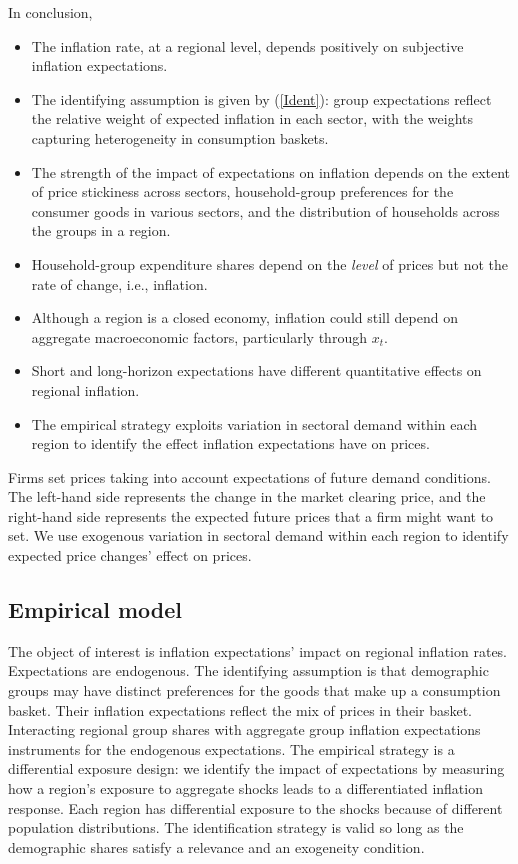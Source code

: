\documentclass[12pt]{article}
\begin{document}
In conclusion,
\begin{itemize}
\item The inflation rate, at a regional level, depends positively on subjective inflation expectations.
\item The identifying assumption is given by (\ref{Ident}): group expectations reflect the relative weight of expected inflation in each sector, with the weights capturing heterogeneity in consumption baskets.
\item The strength of the impact of expectations on inflation depends on the extent of price stickiness across sectors, household-group preferences for the consumer goods in various sectors, and the distribution of households across the groups in a region.
\item Household-group expenditure shares depend on the \emph{level} of prices but not the rate of change, i.e., inflation.
\item Although a region is a closed economy, inflation could still depend on aggregate macroeconomic factors, particularly through $x_t$. 
\item Short and long-horizon expectations have different quantitative effects on regional inflation.
\item The empirical strategy exploits variation in sectoral demand within each region to identify the effect inflation expectations have on prices.
\end{itemize}


Firms set prices taking into account expectations of future demand conditions. The left-hand side represents the change in the market clearing price, and the right-hand side represents the expected future prices that a firm might want to set. We use exogenous variation in sectoral demand within each region to identify expected price changes' effect on prices.  

\subsection{Empirical model}

The object of interest is inflation expectations' impact on regional inflation rates. Expectations are endogenous. The identifying assumption is that demographic groups may have distinct preferences for the goods that make up a consumption basket. Their inflation expectations reflect the mix of prices in their basket. Interacting regional group shares with aggregate group inflation expectations instruments for the endogenous expectations. The empirical strategy is a differential exposure design: we identify the impact of expectations by measuring how a region's exposure to aggregate shocks leads to a differentiated inflation response. Each region has differential exposure to the shocks because of different population distributions. The identification strategy is valid so long as the demographic shares satisfy a relevance and an exogeneity condition.
\end{document}
